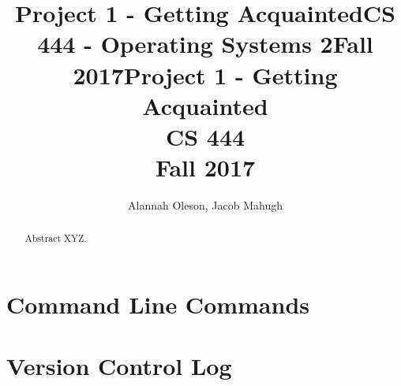 \documentclass[letterpaper,10pt,titlepage]{article}
\title{Project 1 - Getting Acquainted}
\title{CS 444 - Operating Systems 2}
\title{Fall 2017}
\author{\name}
\def\name{Alannah Oleson, Jacob Mahugh}
\begin{document}
\begin{titlepage}
   \title{Project 1 - Getting Acquainted\\CS 444\\Fall 2017}
   \author{\name}
   \maketitle

   \begin{abstract}
      Abstract XYZ.
   \end{abstract}

\end{titlepage}


\section{Command Line Commands}


\section{Version Control Log} 


\end{document}
